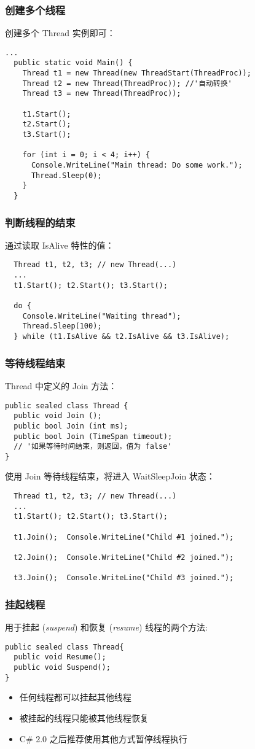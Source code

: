 \begin{frame}[fragile]
\frametitle{创建多个线程}
创建多个 Thread 实例即可：
\begin{lstlisting}[escapeinside='']
...
  public static void Main() {
    Thread t1 = new Thread(new ThreadStart(ThreadProc));
    Thread t2 = new Thread(ThreadProc)); //'自动转换'
    Thread t3 = new Thread(ThreadProc));

    t1.Start();
    t2.Start();
    t3.Start();

    for (int i = 0; i < 4; i++) {
      Console.WriteLine("Main thread: Do some work.");
      Thread.Sleep(0);
    }
  }
\end{lstlisting}
\end{frame}

\begin{frame}[fragile]
\frametitle{判断线程的结束}
通过读取 IsAlive 特性的值：
\begin{lstlisting}
  Thread t1, t2, t3; // new Thread(...)
  ...
  t1.Start(); t2.Start(); t3.Start();

  do {
    Console.WriteLine("Waiting thread");
    Thread.Sleep(100);
  } while (t1.IsAlive && t2.IsAlive && t3.IsAlive);

\end{lstlisting}
\end{frame}

\begin{frame}[fragile]
\frametitle{等待线程结束}
Thread 中定义的 Join 方法：
\begin{lstlisting}[escapeinside='']
public sealed class Thread {
  public void Join ();
  public bool Join (int ms);
  public bool Join (TimeSpan timeout);
  // '如果等待时间结束，则返回，值为 false'
}
\end{lstlisting}
\pause
使用 Join 等待线程结束，将进入 WaitSleepJoin 状态：
\begin{lstlisting}
  Thread t1, t2, t3; // new Thread(...)
  ...
  t1.Start(); t2.Start(); t3.Start();

  t1.Join();  Console.WriteLine("Child #1 joined.");

  t2.Join();  Console.WriteLine("Child #2 joined.");

  t3.Join();  Console.WriteLine("Child #3 joined.");

\end{lstlisting}
\end{frame}

\begin{frame}[fragile]
\frametitle{挂起线程}
用于挂起 (\textit{suspend}) 和恢复 (\textit{resume}) 线程的两个方法: 
\begin{lstlisting}
public sealed class Thread{
  public void Resume();
  public void Suspend();
}
\end{lstlisting}
\begin{itemize}
\item 任何线程都可以挂起其他线程
\item 被挂起的线程只能被其他线程恢复
\item C\# 2.0 之后推荐使用其他方式暂停线程执行
\end{itemize}

\end{frame}



